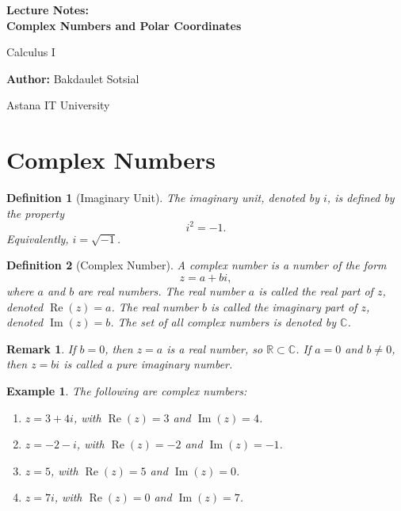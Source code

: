 \documentclass[11pt,a4paper]{article}
\newtheorem{example}{Example}
\newtheorem{definition}{Definition}
\newtheorem{remark}{Remark}
\begin{document}
\begin{titlepage}
\centering
\vspace*{4cm}
{\Huge\bfseries Lecture Notes:\\ Complex Numbers and Polar Coordinates\par}
\vspace{1cm}
{\Large Calculus I\par}
\vspace{2cm}
{\large \textbf{Author:} Bakdaulet Sotsial\par}
\vspace{1cm}
\vfill
{\small Astana IT University \par}
\vspace*{2cm}
\end{titlepage}
\tableofcontents
\newpage
\section{Complex Numbers}
\begin{definition}[Imaginary Unit]
The \textit{imaginary unit}, denoted by $i$, is defined by the property
\[
i^2 = -1.
\]
Equivalently, $i = \sqrt{-1}$.
\end{definition}
\begin{definition}[Complex Number]
A \textit{complex number} is a number of the form
\[
z = a + bi,
\]
where $a$ and $b$ are real numbers. The real number $a$ is called the \textit{real part} of $z$, denoted $\operatorname{Re}(z) = a$. The real number $b$ is called the \textit{imaginary part} of $z$, denoted $\operatorname{Im}(z) = b$. The set of all complex numbers is denoted by $\mathbb{C}$.
\end{definition}
\begin{remark}
If $b = 0$, then $z = a$ is a real number, so $\mathbb{R} \subset \mathbb{C}$. If $a = 0$ and $b \neq 0$, then $z = bi$ is called a \textit{pure imaginary number}.
\end{remark}
\begin{example}
The following are complex numbers:
\begin{enumerate}
\item $z = 3 + 4i$, with $\operatorname{Re}(z) = 3$ and $\operatorname{Im}(z) = 4$.
\item $z = -2 - i$, with $\operatorname{Re}(z) = -2$ and $\operatorname{Im}(z) = -1$.
\item $z = 5$, with $\operatorname{Re}(z) = 5$ and $\operatorname{Im}(z) = 0$.
\item $z = 7i$, with $\operatorname{Re}(z) = 0$ and $\operatorname{Im}(z) = 7$.
\end{enumerate}
\end{example}
\end{document}
